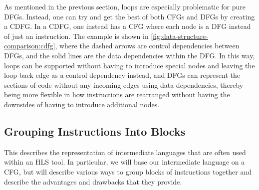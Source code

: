 As mentioned in the previous section, loops are especially problematic for pure
\glspl{DFG}.  Instead, one can try and get the best of both \glspl{CFG} and
\glspl{DFG} by creating a \gls{CDFG}.  In a \gls{CDFG}, one instead has a
\gls{CFG} where each node is a \gls{DFG} instead of just an instruction.  The
example is shown in \cref{fig:data-structure-comparison:cdfg}, where the dashed
arrows are control dependencies between \glspl{DFG}, and the solid lines are the
data dependencies within the \gls{DFG}.  In this way, loops can be supported
without having to introduce special nodes and leaving the loop back edge as a
control dependency instead, and \glspl{DFG} can represent the sections of code
without any incoming edges using data dependencies, thereby being more flexible
in how instructions are rearranged without having the downsides of having to
introduce additional nodes.

\subsection{Grouping Instructions Into Blocks}%
\label{sec:bg:intermediate-language}

This  describes the representation of
intermediate languages that are often used within an \gls{HLS} tool.  In
particular, we will base our intermediate language on a \gls{CFG}, but will
describe various ways to group blocks of instructions together and describe the
advantages and drawbacks that they provide.

